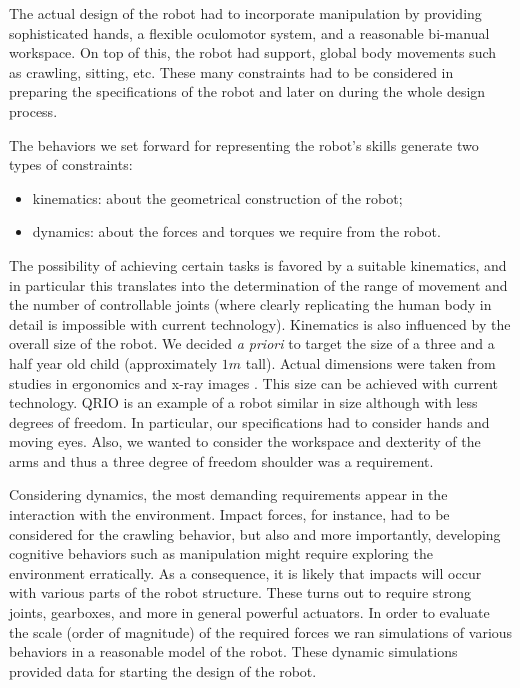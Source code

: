 The actual design of the robot had to incorporate manipulation by providing 
sophisticated hands, a flexible oculomotor system, and a reasonable bi-manual 
workspace. On top of this, the robot had support, global body movements such as 
crawling, sitting, etc. These many constraints had to be considered in preparing 
the specifications of the robot and later on during the whole design process.

The behaviors we set forward for representing the robot's skills generate two 
types of constraints:
\begin{itemize}
	\item kinematics: about the geometrical construction of the robot;
	\item dynamics: about the forces and torques we require from the robot.
\end{itemize}

The possibility of achieving certain tasks is favored by a suitable kinematics, 
and in particular this translates into the determination of the range of movement 
and the number of controllable joints (where clearly replicating the human body 
in detail is impossible with current technology). Kinematics is also 
influenced by the overall size of the robot. We decided {\em a priori} to target the 
size of a three and a half year old child (approximately $1m$ tall). Actual 
dimensions were taken from studies in ergonomics and x-ray images \cite{}. 
This size can be achieved with current technology. QRIO \cite{} is an example 
of a robot similar in size although with less degrees of freedom. In particular, 
our specifications had to consider hands and moving eyes. Also, we wanted to 
consider the workspace and dexterity of the arms and thus a three degree of 
freedom shoulder was a requirement. 


Considering dynamics, the most demanding requirements appear in the 
interaction with the environment. Impact forces, for instance, had to be 
considered for the crawling behavior, but also and more importantly, developing 
cognitive behaviors such as manipulation might require exploring the environment 
erratically. As a consequence, it is likely that impacts will occur with
various parts of the robot structure. These turns out to require strong 
joints, gearboxes, and more in general powerful actuators. In order to evaluate 
the scale (order of magnitude) of the required forces we ran simulations 
of various behaviors in a reasonable model of the robot. These dynamic simulations 
provided data for starting the design of the robot.

